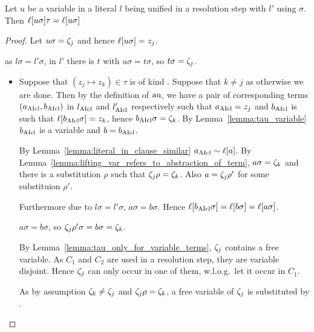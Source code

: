 \documentclass[,%
	paper=a4,%
	DIV14, 
	liststotoc,
	bibtotoc,
	draft=false,%
	numbers=noendperiod
]{scrartcl}
\begin{document}
\cbstart
\begin{lemma}
	\label{lemma:just_introduced_lifting_vars_not_affected_by_tau}
	Let $u$ be a variable in a literal $l$ being unified in a resolution step with $l'$ using $\sigma$.
	Then $\ell[u\sigma] \tau = \ell[u\sigma]$
\end{lemma}
\begin{proof}
	Let $u\sigma = \zeta_{j}$ and hence $\ell[u\sigma] = z_j$.



	as $l\sigma = l'\sigma$, in $l'$ there is $t$ with $u\sigma = t\sigma$, so $t\sigma = \zeta_{j}$.


	\begin{itemize}
			\item
				Suppose that $(z_j\mapsto z_k) \in \tau$ is of kind . Suppose that $k\neq j$ as otherwise we are done.
				Then by the definition of $\operatorname{au}$, we have a pair of corresponding terms $(a_{\operatorname{AIcl}}, b_{\operatorname{AIcl}})$ in $l_{\operatorname{AIcl}}$ and $l_{\operatorname{AIcl}}'$ respectively such that  
				$a_{\operatorname{AIcl}} = z_j$ and $b_{\operatorname{AIcl}}$ is such that $\ell[b_{\operatorname{AIcl}}\sigma] = z_k$, hence $b_{\operatorname{AIcl}}\sigma = \zeta_{k}$.
				By Lemma~\ref{lemma:tau_variable} $b_{\operatorname{AIcl}}$ is a variable and $b = b_{\operatorname{AIcl}}$.

				By Lemma~\ref{lemma:literal_in_clause_similar} $a_{\operatorname{AIcl}} \sim \ell[a]$. 
				By Lemma~\ref{lemma:lifting_var_refers_to_abstraction_of_term}, $a\sigma = \zeta_{k}$ and there is a substitution $\rho$ such that $\zeta_{j}\rho = \zeta_{k}$.
				Also $a = \zeta_{j}\rho'$ for some substituion $\rho'$.

				Furthermore due to $l\sigma = l'\sigma$, $a\sigma = b\sigma$.
				Hence $\ell[b_{\operatorname{AIcl}}\sigma] = \ell[b\sigma] = \ell[a\sigma]$.

				$a\sigma = b\sigma$, so $\zeta_{j}\rho'\sigma = b\sigma = \zeta_{k}$. 

				By Lemma~\ref{lemma:tau_only_for_variable_terms}, $\zeta_{j}$ contains a free variable.
				As $C_1$ and $C_2$ are used in a resolution step, they are variable disjoint. 
				Hence $\zeta_{j}$ can only occur in one of them, w.l.o.g.\ let it occur in $C_1$.

				As by assumption $\zeta_{k} \neq \zeta_{j}$ and $\zeta_{j}\rho = \zeta_{k}$, a free variable of $\zeta_{j}$ is substituted by .


\end{itemize}
\end{proof}
\end{document}
